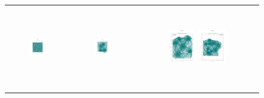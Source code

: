 \begin{figure}[p]
\begin{tabular}{ccc}
        \includegraphics[height=36mm,width=0.24\textwidth]{Images/simulation_no_obs/straight_paths/41.png}
        & \includegraphics[height=36mm,width=0.24\textwidth]{Images/simulation_no_obs/straight_paths/42.png}
        & \includegraphics[height=36mm,width=0.24\textwidth]{Images/simulation_no_obs/straight_paths/43.png}
        \includegraphics[height=36mm,width=0.24\textwidth]{Images/simulation_no_obs/straight_paths/44.png}\\[-4pt]


\end{tabular}
\end{figure}
